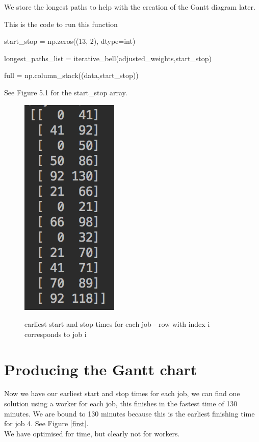 \documentclass[paper=a4, fontsize=12pt]{scrartcl} %
\numberwithin{equation}{section}       %
\numberwithin{figure}{section}         %
\numberwithin{table}{section}          %
\begin{document}
We store the longest paths to help with the creation of the Gantt diagram later.

This is the code to run this function

\begin{python}
    start_stop = np.zeros((13, 2), dtype=int)

    longest_paths_list = iterative_bell(adjusted_weights,start_stop)

    full = np.column_stack((data,start_stop))
    \end{python}

See Figure 5.1 for the start\_stop array.

\begin{figure}[h]
\caption{earliest start and stop times for each job - row with index i corresponds to job i}
\centering
\includegraphics[scale=0.8]{lists}\label{startst}
\end{figure}

\section{Producing the Gantt chart}

Now we have our earliest start and stop times for each job, we can find one solution using a worker for each job, this finishes in the fastest time of 130 minutes. We are bound to 130 minutes because this is the earliest finishing time for job 4. See Figure \ref{first}.\\
We have optimised for time, but clearly not for workers. \\
\end{document}
